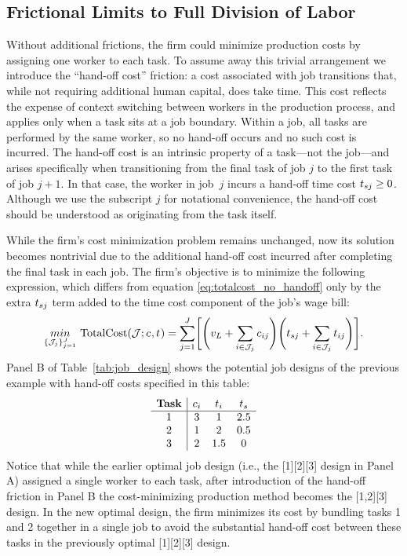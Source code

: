 \documentclass{article}
\theoremstyle{plain}
\theoremstyle{plain}
\begin{document}
\subsection{Frictional Limits to Full Division of Labor}
Without additional frictions, the firm could minimize production costs by assigning one worker to each task.
To assume away this trivial arrangement we introduce the ``hand-off cost” friction: a cost associated with job transitions that, while not requiring additional human capital, does take time.
This cost reflects the expense of context switching between workers in the production process, and applies only when a task sits at a job boundary.  
Within a job, all tasks are performed by the same worker, so no hand-off occurs and no such cost is incurred.
The hand-off cost is an intrinsic property of a task---not the job---and arises specifically when transitioning from the final task of job $j$ to the first task of job $j+1$.  
In that case, the worker in job~$j$ incurs a hand-off time cost $t_{sj} \ge 0$.
Although we use the subscript $j$ for notational convenience, the hand-off cost should be understood as originating from the task itself.

While the firm's cost minimization problem remains unchanged, now its solution becomes nontrivial due to the additional hand-off cost incurred after completing the final task in each job.  
The firm's objective is to minimize the following expression, which differs from equation \ref{eq:totalcost_no_handoff} only by the extra $t_{sj}$ term added to the time cost component of the job's wage bill:
\begin{align}
\label{eq:totalcost_with_handoff}
\underset{\{\mathcal{J}_j\}_{j=1}^J}{min} \ 
\text{TotalCost}(\mathcal{J}; \hccost{}, \timecost{}) 
= 
\sum_{j=1}^J \Biggl[\Biggl(v_L + \sum_{i \in \mathcal{J}_j} \hccost{ij} \Biggr) \Biggl(\handofftime{j} + \sum_{i \in \mathcal{J}_j} \timecost{ij} \Biggr)\Biggr].
\end{align}
Panel B of Table~\ref{tab:job_design} shows the potential job designs of the previous example with hand-off costs specified in this table:
\[
\begin{array}{c|ccc}
\textbf{Task} & c_{i} & t_{i} & t_{s} \\ \hline
1 & 3  & 1   & 2.5 \\
2 & 1 & 2   & 0.5 \\
3 & 2   & 1.5 & 0 \\
\end{array}
\]
Notice that while the earlier optimal job design (i.e., the [1][2][3] design in Panel A) assigned a single worker to each task, after introduction of the hand-off friction in Panel B the cost-minimizing production method becomes the [1,2][3] design.
In the new optimal design, the firm minimizes its cost by bundling tasks 1 and 2 together in a single job to avoid the substantial hand-off cost between these tasks in the previously optimal [1][2][3] design.
\end{document}
